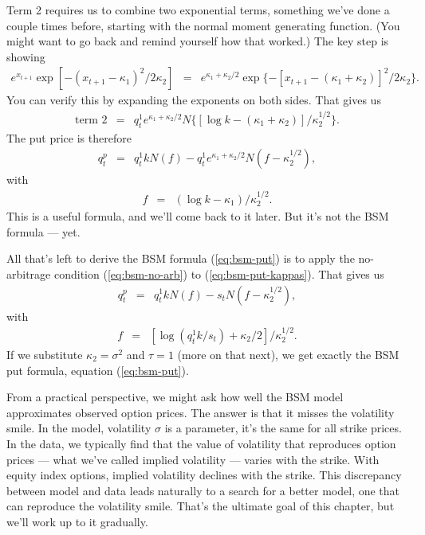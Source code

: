 \documentclass[11pt]{article}
\begin{document}
Term 2 requires us to combine two exponential terms, something
we've done a couple times before, starting with the normal
moment generating function.
(You might want to go back and remind yourself how that worked.)
The key step is showing
\begin{eqnarray*}
    e^{x_{t+1}} \exp[ - (x_{t+1} - \kappa_1)^2/2\kappa_2] &=&
        e^{\kappa_1 + \kappa_2/2} \exp\{ - [x_{t+1} - (\kappa_1+\kappa_2)]^2/2\kappa_2 \} .
\end{eqnarray*}
You can verify this by expanding the exponents on both sides.
That gives us
\begin{eqnarray*}
    \mbox{term 2} &=& q^1_t e^{\kappa_1 + \kappa_2/2}
            N \{ [\log k - (\kappa_1 + \kappa_2)]/\kappa_2^{1/2} \} .
\end{eqnarray*}
The put price is therefore
\begin{eqnarray}
    q^p_t &=& q^1_t k N (f) - q^1_t e^{\kappa_1 + \kappa_2/2}
            N ( f - \kappa_2^{1/2} ),
    \label{eq:bsm-put-kappas}
\end{eqnarray}
with
\begin{eqnarray*}
    f &=&  (\log k - \kappa_1)/\kappa_2^{1/2} .
\end{eqnarray*}
This is a useful formula, and we'll come back to it later.
But it's not the BSM formula --- yet.

All that's left to derive the BSM formula (\ref{eq:bsm-put})
is to apply the no-arbitrage condition (\ref{eq:bsm-no-arb})
to (\ref{eq:bsm-put-kappas}).
That gives us
\begin{eqnarray}
    q^p_t &=& q^1_t k N (f) - s_t N ( f - \kappa_2^{1/2} ),
    \label{eq:bsm-put-kappas-bsm}
\end{eqnarray}
with
\begin{eqnarray*}
    f &=&  [\log (q^1_t k/s_t) + \kappa_2/2]/\kappa_2^{1/2} .
\end{eqnarray*}
If we substitute $\kappa_2 = \sigma^2$ and $\tau = 1$ (more on that next),
we get exactly the BSM put formula, equation (\ref{eq:bsm-put}).

From a practical perspective, we might ask how well the BSM model
approximates observed option prices.
The answer is that it misses the volatility smile.
In the model, volatility $\sigma$ is a parameter, it's the same
for all strike prices.
In the data, we typically find that the value of volatility that reproduces
option prices --- what we've called implied volatility ---
varies with the strike.
With equity index options, implied volatility declines with the strike.
This discrepancy between model and data leads naturally to a search
for a better model, one that can reproduce the volatility smile.
That's the ultimate goal of this chapter,
but we'll work up to it gradually.
\end{document}
